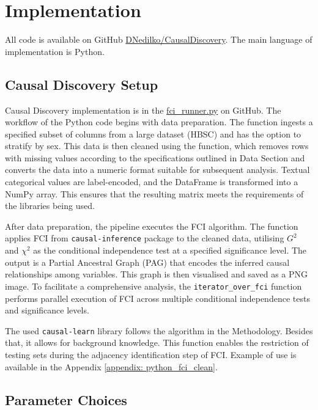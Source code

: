 \documentclass[main.tex]{subfiles}
\begin{document}
\section{Implementation}
All code is available on GitHub \href{https://github.com/DNedilko/CausalDiscoveryProject/tree/244b50fed45bf1547cf7d0a1053891f276ac663b/Project}{DNedilko/CausalDiscovery}. The main language of implementation is Python. 
\subsection{Causal Discovery Setup}
Causal Discovery implementation is in the \href{https://github.com/DNedilko/CausalDiscoveryProject/blob/main/Project/fci_runner.py}{fci\_runner.py} on GitHub. 
The workflow of the Python code begins with data preparation. The  function ingests a specified subset of columns from a large dataset (HBSC) and has the option to stratify by sex. This data is then cleaned using the  function, which removes rows with missing values according to the specifications outlined in Data Section and converts the data into a numeric format suitable for subsequent analysis. Textual categorical values are label-encoded, and the DataFrame is transformed into a NumPy array. This ensures that the resulting matrix meets the requirements of the libraries being used.

After data preparation, the pipeline executes the FCI algorithm. The  function applies FCI from \texttt{causal-inference} package to the cleaned data, utilising $G^2$ and $\chi^2$ as the conditional independence test at a specified significance level. The output is a Partial Ancestral Graph (PAG) that encodes the inferred causal relationships among variables. This graph is then visualised and saved as a PNG image. To facilitate a comprehensive analysis, the \texttt{iterator\_over\_fci} function performs parallel execution of FCI across multiple conditional independence tests and significance levels.

 The used \texttt{causal-learn} library follows the algorithm in the Methodology. Besides that, it allows for background knowledge. This function enables the restriction of testing sets during the adjacency identification step of FCI\cite{causal-learn-docs}. 
 Example of use is available in the Appendix \ref{appendix: python_fci_clean}.

\subsection{Parameter Choices}
\end{document}
